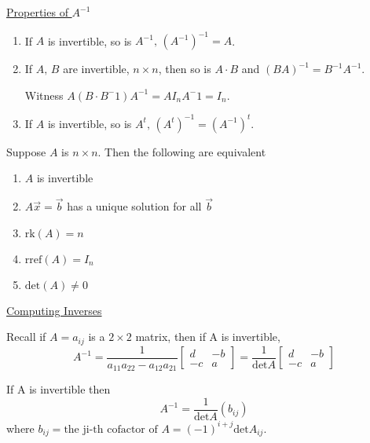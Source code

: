 \documentclass[../main.tex]{subfiles}
\begin{document}
\underline{Properties of \( A^{-1} \)}
\begin{enumerate}
    \item If \( A \) is invertible, so is \( A^{-1}, \, \left( A^{-1} \right)^{-1} = A \).
    \item If \( A, \, B \) are invertible, \( n \times n \), then so is \( A \cdot B \) and \( (BA)^{-1} = B^{-1}A^{-1} \).

        Witness \( A \left( B \cdot B^-1 \right)A^{-1} = A I_n A^-1 = I_n \).
    \item If \( A \) is invertible, so is \( A^t, \, \left( A^t \right)^{-1} = \left( A^{-1} \right)^t \).
\end{enumerate}

\begin{theorem}[]
    Suppose \( A \) is \( n \times n \).
    Then the following are equivalent
    \begin{enumerate}
        \item \( A \) is invertible
        \item \( A \vec{x} = \vec{b} \) has a unique solution for all \( \vec{b} \)
        \item \( \text{rk}(A) = n \)
        \item \( \text{rref}(A) = I_n \)
        \item \( \text{det}(A) \neq 0 \)
    \end{enumerate}
\end{theorem}

\underline{Computing Inverses}

Recall if \( A = a_{ij} \) is a \( 2 \times 2 \) matrix, then
if A is invertible,
\[ A^{-1} = \frac{1}{a_{11}a_{22}-a_{12}a_{21}} \begin{bmatrix}
    d & -b \\
    -c & a
\end{bmatrix} = \frac{1}{\text{det}A} \begin{bmatrix}
    d & -b \\
    -c & a
\end{bmatrix} \]

\begin{theorem}
    If A is invertible then
    \[ A^{-1} = \displaystyle \frac{1}{\text{det}A}(b_{ij})\]
    where \( b_{ij} = \text{the ji-th cofactor of } A = (-1)^{i+j}\text{det}A_{ij}\).
\end{theorem}
\end{document}
